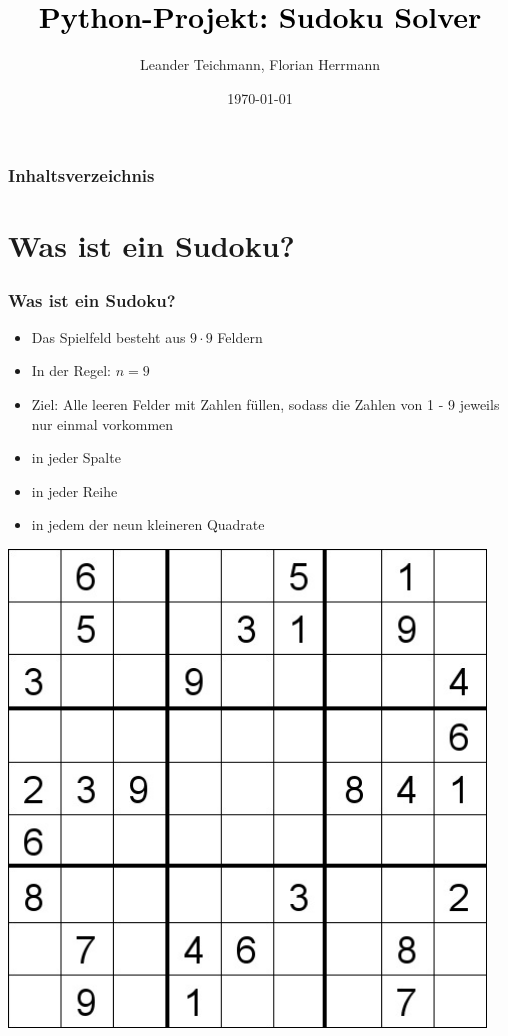 \documentclass{beamer}
\begin{document}
\title{\textcolor{black}{Python-Projekt: Sudoku Solver}}   
\author{Leander Teichmann, Florian Herrmann} 
\date{\today}

\begin{frame}
\titlepage
\end{frame}


\begin{frame}
\frametitle{Inhaltsverzeichnis}\tableofcontents
\end{frame}

\section{Was ist ein Sudoku?}
\begin{frame}
	\frametitle{Was ist ein Sudoku?} 
	\begin{minipage}{0.48\textwidth}
	\begin{itemize}
		\item Das Spielfeld besteht aus $9 \cdot 9$ Feldern
		\item In der Regel: $n = 9$
		\item Ziel: Alle leeren Felder mit Zahlen füllen, sodass die Zahlen von 1 - 9 jeweils nur einmal vorkommen 
		\item in jeder Spalte 
		\item in jeder Reihe 
		\item in jedem der neun kleineren Quadrate
	\end{itemize} 
	\end{minipage}
	\begin{minipage}{0.48\textwidth}
		\centering
		\includegraphics[width=0.95\textwidth]{img/sudoku.jpg}
	\end{minipage}
\end{frame}
\end{document}
